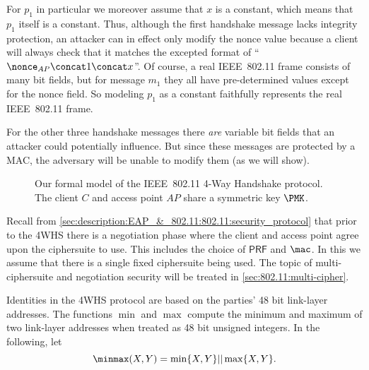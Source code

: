 For $p_1$ in particular we moreover assume that $x$ is a constant, 
which means that $p_1$ itself is a constant.
Thus, 
although the first handshake message lacks integrity protection,
an attacker can in effect only modify the nonce value because a client will always check that it matches the excepted format of ``$\nonce_{AP} \concat 1 \concat x$''.
Of course,
a real IEEE~802.11 frame consists of many bit fields,
but for message $m_1$ they all have pre-determined values except for the nonce field.
So modeling $p_1$ as a constant faithfully represents the real IEEE~802.11 frame.
 
For the other three handshake messages there \emph{are} variable bit fields that an attacker could potentially influence.
But since these messages are protected by a MAC,
the adversary will be unable to modify them (as we will show).



\begin{figure}

	\centering

	

	\caption{Our formal model of the IEEE~802.11 4-Way Handshake protocol. 
	The client $C$ and access point $AP$ share a symmetric key $\PMK$.
	}
	\label{fig:4WHS}
\end{figure}


Recall from \cref{sec:description:EAP_&_802.11:802.11:security_protocol} that prior to the 4WHS there is a negotiation phase where the client and access point agree upon the ciphersuite to use. 
This includes the choice of $\mathsf{PRF}$ and $\mac$.
In this  we assume that there is a single fixed ciphersuite being used.
The topic of multi-ciphersuite and negotiation security will be treated in \cref{sec:802.11:multi-cipher}. 

Identities in the 4WHS protocol are based on the parties' 48 bit link-layer addresses.
The functions  $\min$ and $\max$ compute the minimum and maximum of two link-layer addresses when treated as 48 bit unsigned integers.
In the following,
let
\begin{equation}
	\minmax(X,Y) = \min \lbrace X, Y \rbrace || \max \lbrace X, Y \rbrace.
\end{equation}

